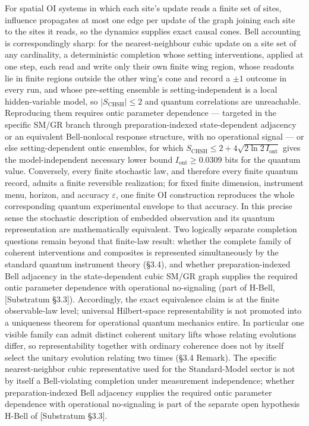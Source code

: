 \documentclass[
]{article}
\begin{document}
For spatial OI systems in which each site's update reads a finite set of
sites, influence propagates at most one edge per update of the graph
joining each site to the sites it reads, so the dynamics supplies exact
causal cones. Bell accounting is correspondingly sharp: for the
nearest-neighbour cubic update on a site set of any cardinality, a
deterministic completion whose setting interventions, applied at one
step, each read and write only their own finite wing region, whose
readouts lie in finite regions outside the other wing's cone and record
a \(\pm1\) outcome in every run, and whose pre-setting ensemble is
setting-independent is a local hidden-variable model, so
\(|S_{\mathrm{CHSH}}|\le2\) and quantum correlations are unreachable.
Reproducing them requires ontic parameter dependence --- targeted in the
specific SM/GR branch through preparation-indexed state-dependent
adjacency or an equivalent Bell-nonlocal response structure, with no
operational signal --- or else setting-dependent ontic ensembles, for
which \(S_{\mathrm{CHSH}}\le2+4\sqrt{2\ln2\,I_{\mathrm{ont}}}\) gives
the model-independent necessary lower bound
\(I_{\mathrm{ont}}\ge0.0309\) bits for the quantum value. Conversely,
every finite stochastic law, and therefore every finite quantum record,
admits a finite reversible realization; for fixed finite dimension,
instrument menu, horizon, and accuracy \(\varepsilon\), one finite OI
construction reproduces the whole corresponding quantum experimental
envelope to that accuracy. In this precise sense the stochastic
description of embedded observation and its quantum representation are
mathematically equivalent. Two logically separate completion questions
remain beyond that finite-law result: whether the complete family of
coherent interventions and composites is represented simultaneously by
the standard quantum instrument theory (§3.4), and whether
preparation-indexed Bell adjacency in the state-dependent cubic SM/GR
graph supplies the required ontic parameter dependence with operational
no-signaling (part of H-Bell, {[}Substratum §3.3{]}). Accordingly, the
exact equivalence claim is at the finite observable-law level; universal
Hilbert-space representability is not promoted into a uniqueness theorem
for operational quantum mechanics entire. In particular one visible
family can admit distinct coherent unitary lifts whose relating
evolutions differ, so representability together with ordinary coherence
does not by itself select the unitary evolution relating two times (§3.4
Remark). The specific nearest-neighbor cubic representative used for the
Standard-Model sector is not by itself a Bell-violating completion under
measurement independence; whether preparation-indexed Bell adjacency
supplies the required ontic parameter dependence with operational
no-signaling is part of the separate open hypothesis H-Bell of
{[}Substratum §3.3{]}.
\end{document}
